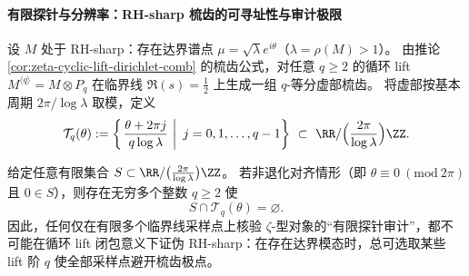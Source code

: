 \paragraph{有限探针与分辨率：RH-sharp 梳齿的可寻址性与审计极限}
设 \(M\) 处于 RH-sharp：存在达界谱点 \(\mu=\sqrt{\lambda}e^{i\theta}\)（\(\lambda=\rho(M)>1\)）。
由推论 \ref{cor:zeta-cyclic-lift-dirichlet-comb} 的梳齿公式，对任意 \(q\ge 2\) 的循环 lift
\(
M^{\langle q\rangle}=M\otimes P_q
\)
在临界线 \(\Re(s)=\tfrac12\) 上生成一组 \(q\)-等分虚部梳齿。
将虚部按基本周期 \(2\pi/\log\lambda\) 取模，定义
\[
\mathcal T_q(\theta):=
\left\{\left.\frac{\theta+2\pi j}{q\log\lambda}\ \right|\ j=0,1,\dots,q-1\right\}
\ \subset\ \RR/\Bigl(\frac{2\pi}{\log\lambda}\Bigr)\ZZ .
\]

\begin{theorem}\label{thm:zeta-cyclic-lift-finite-probe-evasion}
给定任意有限集合
\(
S\subset \RR/\bigl(\tfrac{2\pi}{\log\lambda}\bigr)\ZZ
\)。
若非退化对齐情形（即 \(\theta\equiv 0\ (\mathrm{mod}\ 2\pi)\) 且 \(0\in S\)），则存在无穷多个整数 \(q\ge 2\) 使
\[
S\cap \mathcal T_q(\theta)=\varnothing.
\]
因此，任何仅在有限多个临界线采样点上核验 \(\zeta\)-型对象的“有限探针审计”，都不可能在循环 lift 闭包意义下证伪 RH-sharp：在存在达界模态时，总可选取某些 lift 阶 \(q\) 使全部采样点避开梳齿极点。
\end{theorem}
